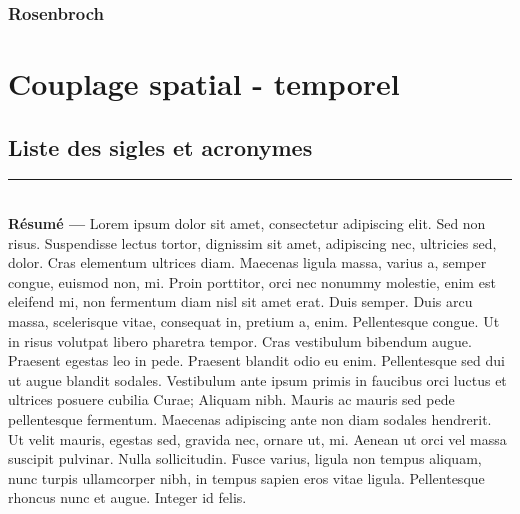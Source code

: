 \documentclass[a4paper,12pt]{report}
\makeatletter
\def\cleardoublepage{\clearpage\if@twoside \ifodd\c@page\else%
  \hbox{}%
  \thispagestyle{empty}%
  \newpage%
  \if@twocolumn\hbox{}\newpage\fi\fi\fi}
\theoremstyle{break}
\makeatother
\begin{document}
\section{Rosenbroch}

\part{Couplage spatial - temporel}
\clearpage
\listoffigures

\clearpage
\chapter*{Liste des sigles et acronymes}
\begin{acronym}[CP-OFDMX] %
\end{acronym}




%
%
%
%


%
%



\thispagestyle{empty}

\vspace*{\fill}
\noindent\rule[2pt]{\textwidth}{0.5pt}\\
{\textbf{Résumé ---}}
Lorem ipsum dolor sit amet, consectetur adipiscing elit. Sed non risus. Suspendisse lectus tortor, dignissim sit amet, adipiscing nec, ultricies sed, dolor. Cras elementum ultrices diam. Maecenas ligula massa, varius a, semper congue, euismod non, mi. Proin porttitor, orci nec nonummy molestie, enim est eleifend mi, non fermentum diam nisl sit amet erat. Duis semper. Duis arcu massa, scelerisque vitae, consequat in, pretium a, enim. Pellentesque congue. Ut in risus volutpat libero pharetra tempor. Cras vestibulum bibendum augue. Praesent egestas leo in pede. Praesent blandit odio eu enim. Pellentesque sed dui ut augue blandit sodales. Vestibulum ante ipsum primis in faucibus orci luctus et ultrices posuere cubilia Curae; Aliquam nibh. Mauris ac mauris sed pede pellentesque fermentum. Maecenas adipiscing ante non diam sodales hendrerit. Ut velit mauris, egestas sed, gravida nec, ornare ut, mi. Aenean ut orci vel massa suscipit pulvinar. Nulla sollicitudin. Fusce varius, ligula non tempus aliquam, nunc turpis ullamcorper nibh, in tempus sapien eros vitae ligula. Pellentesque rhoncus nunc et augue. Integer id felis.
\end{document}
